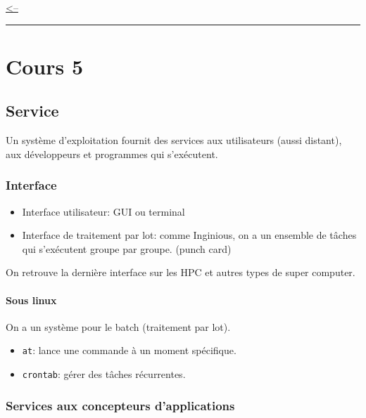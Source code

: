 \href{../README.md}{\textless--}

\begin{center}\rule{0.5\linewidth}{0.5pt}\end{center}

\section{Cours 5}\label{cours-5}

\subsection{Service}\label{service}

Un système d'exploitation fournit des services aux utilisateurs (aussi
distant), aux développeurs et programmes qui s'exécutent.

\subsubsection{Interface}\label{interface}

\begin{itemize}
\tightlist
\item
  Interface utilisateur: GUI ou terminal
\item
  Interface de traitement par lot: comme Inginious, on a un ensemble de
  tâches qui s'exécutent groupe par groupe. (punch card)
\end{itemize}

On retrouve la dernière interface sur les HPC et autres types de super
computer.

\paragraph{Sous linux}\label{sous-linux}

On a un système pour le batch (traitement par lot).

\begin{itemize}
\tightlist
\item
  \texttt{at}: lance une commande à un moment spécifique.
\item
  \texttt{crontab}: gérer des tâches récurrentes.
\end{itemize}

\subsubsection{Services aux concepteurs
d'applications}\label{services-aux-concepteurs-dapplications}

